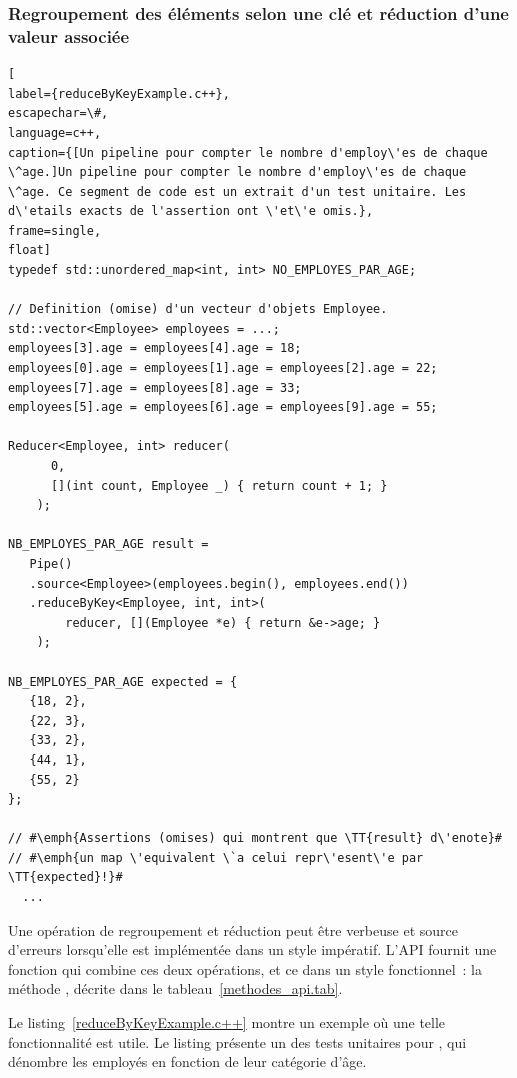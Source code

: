 \subsubsection{Regroupement des \'el\'ements selon une cl\'e et r\'eduction d'une valeur associ\'ee}

\begin{lstlisting}[
label={reduceByKeyExample.c++},
escapechar=\#,
language=c++,
caption={[Un pipeline pour compter le nombre d'employ\'es de chaque \^age.]Un pipeline pour compter le nombre d'employ\'es de chaque \^age. Ce segment de code est un extrait d'un test unitaire. Les d\'etails exacts de l'assertion ont \'et\'e omis.},
frame=single,
float]
typedef std::unordered_map<int, int> NO_EMPLOYES_PAR_AGE;

// Definition (omise) d'un vecteur d'objets Employee.
std::vector<Employee> employees = ...; 
employees[3].age = employees[4].age = 18;
employees[0].age = employees[1].age = employees[2].age = 22;
employees[7].age = employees[8].age = 33;
employees[5].age = employees[6].age = employees[9].age = 55;

Reducer<Employee, int> reducer(
      0,
      [](int count, Employee _) { return count + 1; }
    );

NB_EMPLOYES_PAR_AGE result = 
   Pipe()
   .source<Employee>(employees.begin(), employees.end())
   .reduceByKey<Employee, int, int>(
   		reducer, [](Employee *e) { return &e->age; }
    );
    
NB_EMPLOYES_PAR_AGE expected = {
   {18, 2},
   {22, 3},
   {33, 2},
   {44, 1},
   {55, 2}
};

// #\emph{Assertions (omises) qui montrent que \TT{result} d\'enote}#
// #\emph{un map \'equivalent \`a celui repr\'esent\'e par \TT{expected}!}#
  ...
\end{lstlisting}

Une op\'eration de regroupement et r\'eduction peut \^etre verbeuse et source d'erreurs lorsqu'elle est impl\'ement\'ee dans un style imp\'eratif. L'{API} fournit une fonction qui combine ces deux op\'erations, et ce  dans un style fonctionnel~: la m\'ethode , d\'ecrite dans le tableau~\ref{methodes_api.tab}. 

Le listing~\ref{reduceByKeyExample.c++} montre un exemple o\`u une telle fonctionnalit\'e est utile. Le listing pr\'esente un des tests unitaires pour , qui d\'enombre les employ\'es en fonction de leur cat\'egorie d'\^age. 

